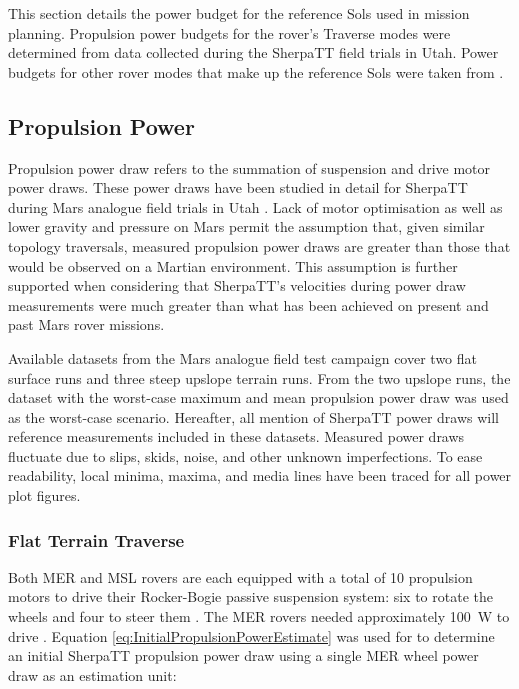 This section details the power budget for the reference Sols used in mission planning. Propulsion power budgets for the rover's Traverse modes were determined from data collected during the SherpaTT field trials in Utah. Power budgets for other rover modes that make up the reference Sols were taken from .


\subsection{Propulsion Power}
\label{sec:PowerBudget:PropulsionPowerBudget}
Propulsion power draw refers to the summation of suspension and drive motor power draws. These power draws have been studied in detail for SherpaTT during Mars analogue field trials in Utah . Lack of motor optimisation as well as lower gravity and pressure on Mars permit the assumption that, given similar topology traversals, measured propulsion power draws are greater than those that would be observed on a Martian environment. This assumption is further supported when considering that SherpaTT's velocities during power draw measurements were much greater than what has been achieved on present and past Mars rover missions.

Available datasets from the Mars analogue field test campaign cover two flat surface runs and three steep upslope terrain runs. From the two upslope runs, the dataset with the worst-case maximum and mean propulsion power draw was used as the worst-case scenario. Hereafter, all mention of SherpaTT power draws will reference measurements included in these datasets. Measured power draws fluctuate due to slips, skids, noise, and other unknown imperfections. To ease readability, local minima, maxima, and media lines have been traced for all power plot figures.

\subsubsection{Flat Terrain Traverse}
\label{sec:PowerBudget:PropulsionPowerBudget:FlatTerrainTraverse}
Both \ac{MER} and \ac{MSL} rovers are each equipped with a total of 10 propulsion motors to drive their Rocker-Bogie passive suspension system: six to rotate the wheels and four to steer them  . The \ac{MER} rovers needed approximately \SI{100}{\watt} to drive . Equation \ref{eq:InitialPropulsionPowerEstimate} was used for to determine an initial SherpaTT propulsion power draw using a single \ac{MER} wheel power draw as an estimation unit:

